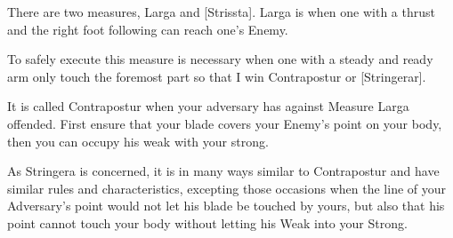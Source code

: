 \newpage


\newpage


 There are two measures, Larga and [Strissta]. Larga is when one with
 a thrust and the right foot following can reach one's Enemy.

To safely execute this measure is necessary when one with a steady and
ready arm only touch the foremost part so that I win Contrapostur or
[Stringerar].

It is called Contrapostur when your adversary has against Measure
Larga offended. First ensure that your blade covers your Enemy's point
on your body, then you can occupy his weak with your strong.

%
As Stringera is concerned, it is in many ways similar to Contrapostur
and have similar rules and characteristics, excepting those occasions
when the line of your Adversary's point would not let his blade be
touched by yours, but also that his point cannot touch your body
without letting his Weak into your Strong.


